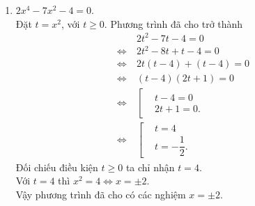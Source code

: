 \begin{ex}
{\begin{enumerate}
   \item $2x^4 - 7x^2 - 4 = 0$.\\
   Đặt $t = x^2$, với $t \geq 0$. Phương trình đã cho trở thành
   \allowdisplaybreaks
   \begin{align*}
    				  & 2t^2 - 7t - 4 = 0 \\
    \Leftrightarrow \ & 2t^2 - 8t + t - 4 = 0 \\
    \Leftrightarrow \ & 2t(t - 4) + (t - 4) = 0 \\
    \Leftrightarrow \ & (t - 4)(2t + 1) = 0 \\
    \Leftrightarrow \ & \left[ \begin{aligned} & t - 4 = 0 \\& 2t + 1 = 0. \end{aligned} \right. \\
    \Leftrightarrow \ & \left[ \begin{aligned} & t = 4 \\& t = -\dfrac{1}{2}. \end{aligned} \right.
   \end{align*}
   Đối chiếu điều kiện $t \geq 0$ ta chỉ nhận $t = 4$.\\
   Với $t = 4$ thì $x^2 = 4 \Leftrightarrow x = \pm 2$.\\
   Vậy phương trình đã cho có các nghiệm $x = \pm 2$.
  \end{enumerate}
  
  }
\end{ex}



